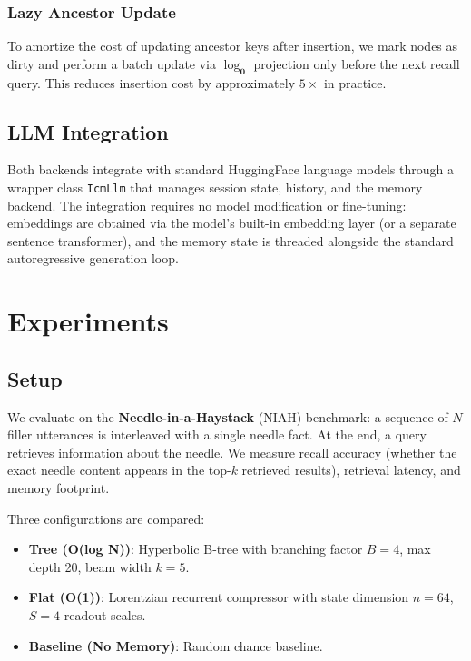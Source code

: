 \documentclass[conference]{IEEEtran}
\begin{document}
\subsubsection{Lazy Ancestor Update}
To amortize the cost of updating ancestor keys after insertion, we mark nodes as dirty and perform a batch update via $\operatorname{log}_{\mathbf{0}}$ projection only before the next recall query. This reduces insertion cost by approximately $5\times$ in practice.

\subsection{LLM Integration}

Both backends integrate with standard HuggingFace language models through a wrapper class \texttt{IcmLlm} that manages session state, history, and the memory backend. The integration requires no model modification or fine-tuning: embeddings are obtained via the model's built-in embedding layer (or a separate sentence transformer), and the memory state is threaded alongside the standard autoregressive generation loop.

\section{Experiments}

\subsection{Setup}

We evaluate on the \textbf{Needle-in-a-Haystack} (NIAH) benchmark: a sequence of $N$ filler utterances is interleaved with a single needle fact. At the end, a query retrieves information about the needle. We measure recall accuracy (whether the exact needle content appears in the top-$k$ retrieved results), retrieval latency, and memory footprint.

Three configurations are compared:
\begin{itemize}
  \item \textbf{Tree (O(log N))}: Hyperbolic B-tree with branching factor $B=4$, max depth 20, beam width $k=5$.
  \item \textbf{Flat (O(1))}: Lorentzian recurrent compressor with state dimension $n=64$, $S=4$ readout scales.
  \item \textbf{Baseline (No Memory)}: Random chance baseline.
\end{itemize}
\end{document}
